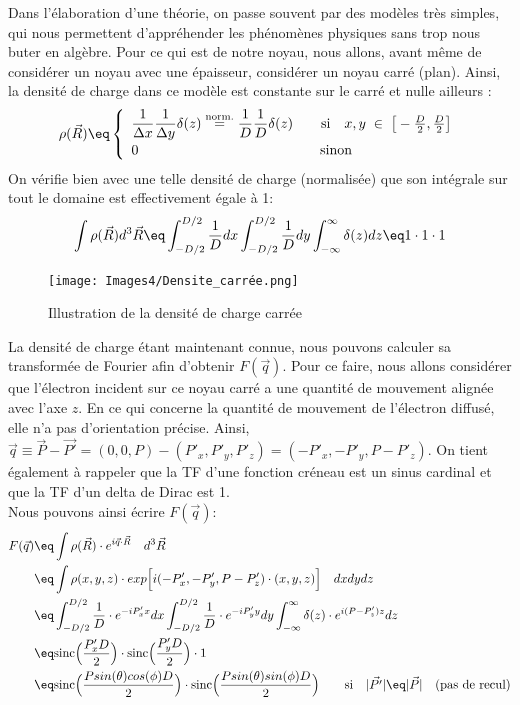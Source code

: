 Dans l'élaboration d'une théorie, on passe souvent par des modèles très simples, qui nous permettent d'appréhender les phénomènes physiques sans trop nous buter en algèbre. Pour ce qui est de notre noyau, nous allons, avant même de considérer un noyau avec une épaisseur, considérer un noyau carré (plan). Ainsi, la densité de charge dans ce modèle est constante sur le carré et nulle ailleurs :
\begin{equation*}
    \rho(\vec{R}) \eq
    \left\{
    \begin{array}{ll}
        \dfrac{1}{\Delta x} \dfrac{1}{\Delta y} \delta(z)
        \overset{\text{norm.}}= 
        \dfrac{1}{D}\dfrac{1}{D}\delta(z)
        \qquad \text{si} \quad
        x,y \;\in\; \big[ -\frac{D}{2},\frac{D}{2} \big]
    \\[7pt]
        0 \qquad \qquad \qquad \qquad \qquad \qquad \quad \text{sinon}
    \end{array}
    \right.
\end{equation*}
On vérifie bien avec une telle densité de charge (normalisée) que son intégrale sur tout le domaine est effectivement égale à 1:
\begin{equation*}
    \int \rho(\vec{R}) d^3\vec{R}
    \eq
    \int_{-D/2}^{D/2}\dfrac{1}{D} dx
    \int_{-D/2}^{D/2}\dfrac{1}{D} dy
    \int_{-\infty}^{\infty}\delta (z)dz
    \eq 1\cdot 1 \cdot 1
\end{equation*}
\begin{figure}[H]
    \centering
    \texttt{[image: Images4/Densite\_carrée.png]}
    \caption{Illustration de la densité de charge carrée}
    \label{fig:Densité carrée}
\end{figure}
La densité de charge étant maintenant connue, nous pouvons calculer sa transformée de Fourier afin d'obtenir $F(\vec{q})$. Pour ce faire, nous allons considérer que l'électron incident sur ce noyau carré a une quantité de mouvement alignée avec l'axe $z$. En ce qui concerne la quantité de mouvement de l'électron diffusé, elle n'a pas d'orientation précise. Ainsi, $\vec{q} \equiv \vec{P}-\vec{P'} = (0,0,P)-(P'_x,P'_y,P'_z) = (-P'_x,-P'_y,P-P'_z) $. On tient également à rappeler que la TF d'une fonction créneau est un sinus cardinal et que la TF d'un delta de Dirac est 1.\\
Nous pouvons ainsi écrire $F(\vec{q})$:
\begin{align*}
    F(\vec{q}) 
    &\eq
    \int \rho(\vec{R}) \cdot e^{i\vec{q} \cdot\vec{R}} \quad d^3\vec{R}\\
    &\eq
    \int \rho(x,y,z) \cdot exp\Big[i(-P'_x,-P'_y,P-P'_z) \cdot(x,y,z)\Big] \quad dxdydz\\
    &\eq
    \int_{-D/2}^{D/2}\dfrac{1}{D} \cdot e^{-iP'_xx} dx
    \int_{-D/2}^{D/2}\dfrac{1}{D} \cdot e^{-iP'_yy} dy
    \int_{-\infty}^{\infty} \delta(z) \cdot e^{i(P-P'_z)z} dz\\
    &\eq
    \text{sinc}\Big(\dfrac{P'_xD}{2}\Big) \cdot
    \text{sinc}\Big(\dfrac{P'_yD}{2}\Big) \cdot 1\\
    &\eq
    \text{sinc}\Big(\dfrac{P sin(\theta)cos(\phi)D}{2}\Big) \cdot
    \text{sinc}\Big(\dfrac{P sin(\theta)sin(\phi)D}{2}\Big)
    \qquad \text{si} \quad |\vec{P'}|\eq|\vec{P}| \quad \text{(pas de recul)}
\end{align*}
